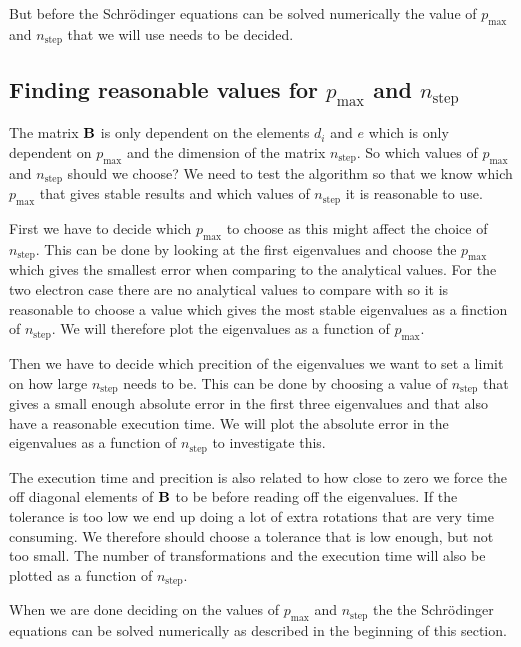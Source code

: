\documentclass[11pt,a4wide]{article}
\begin{document}
But before the Schr\"odinger equations can be solved numerically the value of $p_{\mathrm{max}}$ and $n_{\mathrm{step}}$ that we will use needs to be decided.  

\subsection{Finding reasonable values for $p_{\mathrm{max}}$ and $n_{\mathrm{step}}$}

The matrix $\bf B$ is only dependent on the elements $d_i$ and $e$ which is only dependent on $p_{\mathrm{max}}$ and the dimension of the matrix $n_{\mathrm{step}}$. So which values of $p_{\mathrm{max}}$ and $n_{\mathrm{step}}$ should we choose? We need to test the algorithm so that we know which $p_{\mathrm{max}}$ that gives stable results and which values of $n_{\mathrm{step}}$ it is reasonable to use. 

First we have to decide which $p_{\mathrm{max}}$ to choose as this might affect the choice of $n_{\mathrm{step}}$. This can be done by looking at the first eigenvalues and choose the $p_{\mathrm{max}}$ which gives the smallest error when comparing to the analytical values. For the two electron case there are no analytical values to compare with so it is reasonable to choose a value which gives the most stable eigenvalues as a finction of  $n_{\mathrm{step}}$. We will therefore plot the eigenvalues as a function of $p_{\mathrm{max}}$.

Then we have to decide which precition of the eigenvalues we want to set a limit on how large $n_{\mathrm{step}}$ needs to be. This can be done by choosing a value of $n_{\mathrm{step}}$ that gives a small enough absolute error in the first three eigenvalues and that also have a reasonable execution time. We will plot the absolute error in the eigenvalues as a function of $n_{\mathrm{step}}$ to investigate this.

The execution time and precition is also related to how close to zero we force the off diagonal elements of $\bf B$ to be before reading off the eigenvalues. If the tolerance is too low we end up doing a lot of extra rotations that are very time consuming. We therefore should choose a tolerance that is low enough, but not too small. The number of transformations and the execution time will also be plotted as a function of $n_{\mathrm{step}}$.

When we are done deciding on the values of $p_{\mathrm{max}}$ and $n_{\mathrm{step}}$ the the Schr\"odinger equations can be solved numerically as described in the beginning of this section. 
\end{document}
